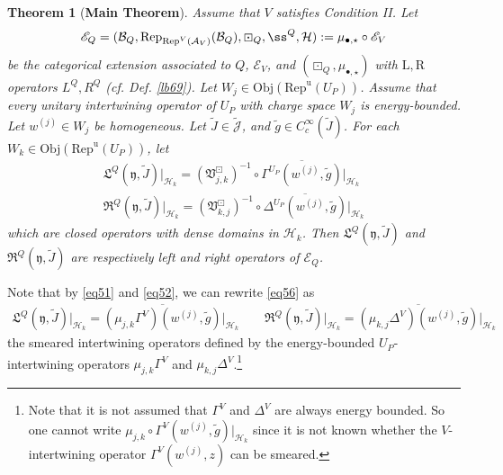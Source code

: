 \documentclass[11pt,b5paper,notitlepage]{article}
\theoremstyle{definition}
\theoremstyle{plain}
\newtheorem{thm}[df]{Theorem}
\newcommand{\fk}{\mathfrak}
\newcommand{\mc}{\mathcal}
\newcommand{\wtd}{\widetilde}
\newcommand{\ovl}{\overline}
\newcommand{\Rep}{\mathrm{Rep}}
\newcommand{\scr}{\mathscr}
\newcommand{\Jtd}{\widetilde{\mathcal J}}
\newcommand{\yk}{\mathfrak y}
\newcommand{\blt}{\bullet}
\newcommand{\Obj}{\mathrm{Obj}}
\newcommand{\RepUP}{\mathrm{Rep}^{\mathrm u}(U_P)}
\numberwithin{equation}{section}
\begin{document}
\begin{thm}[\textbf{Main Theorem}]\label{lb72}
Assume that $V$ satisfies Condition II. Let
\begin{align*}
\scr E_Q=(\mc B_Q,\Rep_{\Rep^V(\mc A_V)}(\mc B_Q),\boxdot_Q,\ss^Q,\mc H):=\mu_{\blt,\star}\circ\scr E_V
\end{align*}
be the categorical extension associated to $Q$, $\scr E_V$, and $(\boxdot_Q,\mu_{\blt,\star})$ with $\mathrm L,\mathrm R$ operators $L^Q,R^Q$ (cf. Def. \ref{lb69}). %
Let $W_j\in\Obj(\RepUP)$. Assume that every unitary intertwining operator of $U_P$ with charge space $W_j$ is energy-bounded. Let $w^{(j)}\in W_j$ be homogeneous. Let $\wtd J\in\Jtd$, and $\wtd g\in C_c^\infty(\wtd J)$. For each $W_k\in\Obj(\RepUP)$, let
\begin{subequations}\label{eq56}
\begin{gather}
\fk L^Q(\yk,\wtd J)\big|_{\mc H_k}=(\fk V_{j,k}^\boxdot)^{-1}\circ\ovl{\Gamma^{U_P}(w^{(j)},\wtd g)}\big|_{\mc H_k}\\
\fk R^Q(\yk,\wtd J)\big|_{\mc H_k}=(\fk V_{k,j}^\boxdot)^{-1}\circ\ovl{\Delta^{U_P}(w^{(j)},\wtd g)}\big|_{\mc H_k}
\end{gather}
\end{subequations}
which are closed operators with dense domains in $\mc H_k$. Then $\fk L^Q(\yk,\wtd J)$ and $\fk R^Q(\yk,\wtd J)$ are respectively left and right operators of $\scr E_Q$.
\end{thm}

Note that by \eqref{eq51} and \eqref{eq52}, we can rewrite \eqref{eq56} as
\begin{gather}\label{eq57}
\fk L^Q(\yk,\wtd J)\big|_{\mc H_k}=\ovl{(\mu_{j,k}\Gamma^V)(w^{(j)},\wtd g)}\big|_{\mc H_k}\qquad
\fk R^Q(\yk,\wtd J)\big|_{\mc H_k}=\ovl{(\mu_{k,j}\Delta^V)(w^{(j)},\wtd g)}\big|_{\mc H_k}
\end{gather}
the smeared intertwining operators defined by the energy-bounded $U_P$-intertwining operators $\mu_{j,k}\Gamma^V$ and $\mu_{k,j}\Delta^V$.\footnote{Note that it is not assumed that $\Gamma^V$ and $\Delta^V$ are always energy bounded. So one cannot write $\mu_{j,k}\circ\Gamma^V(w^{(j)},\wtd g)|_{\mc H_k}$ since it is not known whether the $V$-intertwining operator $\Gamma^V(w^{(j)},z)$ can be smeared.}
\end{document}

